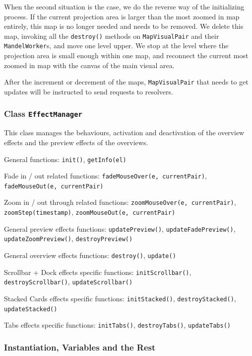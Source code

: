 When the second situation is the case, we do the reverse way of the initializing process. If the current projection area is larger than the most zoomed in \gls{map} entirely, this \gls{map} is no longer needed and needs to be removed. We delete this \gls{map}, invoking all the \texttt{destroy()} methods on \texttt{MapVisualPair} and their \texttt{MandelWorker}s, and move one level upper. We stop at the level where the projection area is small enough within one \gls{map}, and reconnect the current most zoomed in map with the canvas of the main visual area.

After the increment or decrement of the \glspl{map}, \texttt{MapVisualPair} that needs to get updates will be instructed to send requests to resolvers.

\subsubsection{Class \texttt{EffectManager}}\label{chap4:effectmanager}

This class manages the behaviours, activation and deactivation of the overview effects and the preview effects of the overviews.

General functions: \texttt{init()}, \texttt{getInfo(el)}

Fade in / out related functions: \texttt{fadeMouseOver(e, currentPair)}, \texttt{fadeMouseOut(e, currentPair)}

Zoom in / out through related functions: \texttt{zoomMouseOver(e, currentPair)}, \texttt{zoomStep(timestamp)}, \texttt{zoomMouseOut(e, currentPair)}

General preview effects functions: \texttt{updatePreview()}, \texttt{updateFadePreview()}, \texttt{updateZoomPreview()}, \texttt{destroyPreview()}

General overview effects functions: \texttt{destroy()}, \texttt{update()}

Scrollbar + Dock effects specific functions: \texttt{initScrollbar()}, \texttt{destroyScrollbar()}, \texttt{updateScrollbar()}

Stacked Cards effects specific functions: \texttt{initStacked()}, \texttt{destroyStacked()}, \texttt{updateStacked()}

Tabs effects specific functions: \texttt{initTabs()}, \texttt{destroyTabs()}, \texttt{updateTabs()}

\subsubsection{Instantiation, Variables and the Rest}

